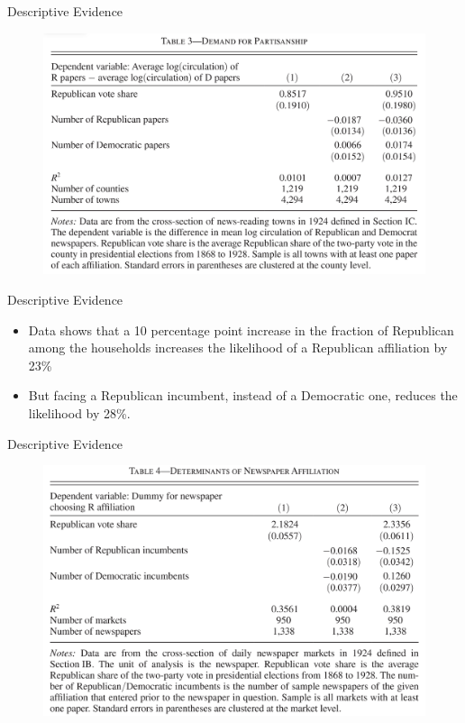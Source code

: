 \documentclass{beamer}
\begin{document}
\begin{frame}[t]{Descriptive Evidence}
  \begin{figure}
  \begin{center}
    \includegraphics[scale=0.15]{Table3.png}
  \end{center}
  \end{figure}
\end{frame}

\begin{frame}[t]{Descriptive Evidence}
  \begin{itemize}
    \item Data shows that a 10 percentage point increase in the fraction of 
      Republican among the households increases the likelihood of a Republican 
      affiliation by 23\%
    \item But facing a Republican incumbent, instead of a Democratic one, 
      reduces the likelihood by 28\%.
  \end{itemize}
\end{frame}


\begin{frame}[t]{Descriptive Evidence}
  \begin{figure}
  \begin{center}
    \includegraphics[scale=0.15]{Table4.png}
  \end{center}
  \end{figure}
\end{frame}
\end{document}
